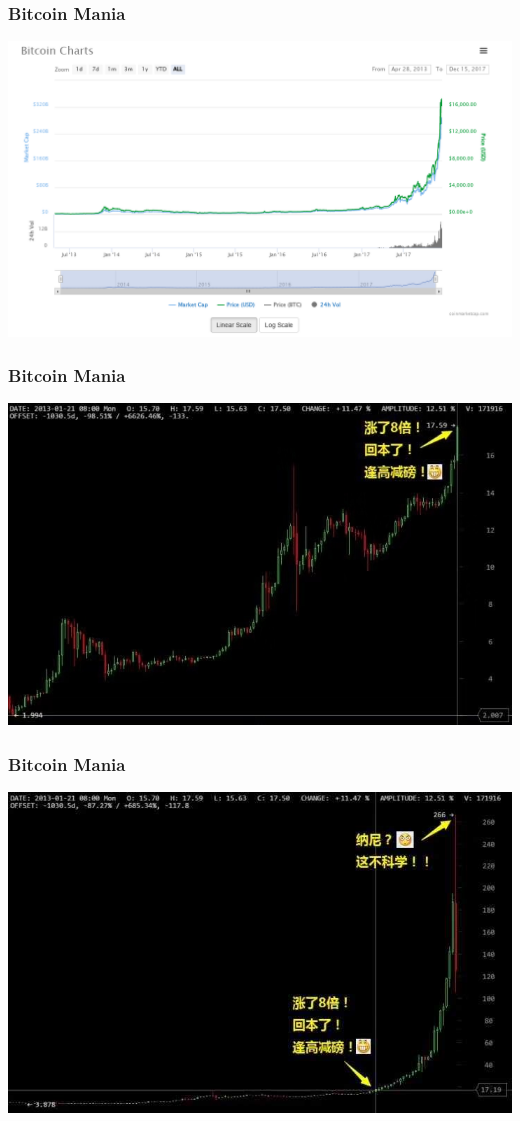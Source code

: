 \begin{frame}
    \frametitle{Bitcoin Mania}
    \includegraphics[scale=0.3]{./figures/bitcoin-usd-prices.png}
\end{frame}

\begin{frame}
    \frametitle{Bitcoin Mania}
    \includegraphics[scale=0.3]{./figures/bitcoin-invest0.jpg}
\end{frame}

\begin{frame}
    \frametitle{Bitcoin Mania}
    \includegraphics[scale=0.3]{./figures/bitcoin-invest1.jpg}
\end{frame}


